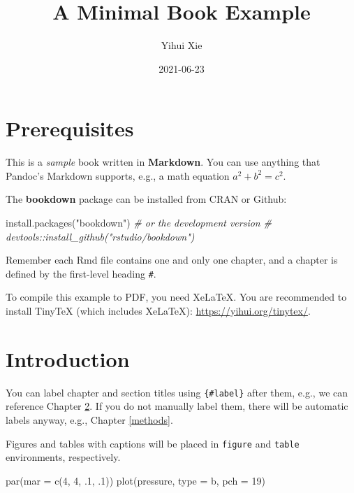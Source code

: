 \documentclass[
]{book}
\title{A Minimal Book Example}
\author{Yihui Xie}
\date{2021-06-23}
\newenvironment{Shaded}{\begin{snugshade}}{\end{snugshade}}
\newcommand{\AttributeTok}[1]{\textcolor[rgb]{0.77,0.63,0.00}{#1}}
\newcommand{\CommentTok}[1]{\textcolor[rgb]{0.56,0.35,0.01}{\textit{#1}}}
\newcommand{\DecValTok}[1]{\textcolor[rgb]{0.00,0.00,0.81}{#1}}
\newcommand{\FunctionTok}[1]{\textcolor[rgb]{0.00,0.00,0.00}{#1}}
\newcommand{\NormalTok}[1]{#1}
\newcommand{\StringTok}[1]{\textcolor[rgb]{0.31,0.60,0.02}{#1}}
\begin{document}
\maketitle

{
\setcounter{tocdepth}{1}
\tableofcontents
}
\hypertarget{prerequisites}{%
\chapter{Prerequisites}\label{prerequisites}}

This is a \emph{sample} book written in \textbf{Markdown}. You can use anything that Pandoc's Markdown supports, e.g., a math equation \(a^2 + b^2 = c^2\).

The \textbf{bookdown} package can be installed from CRAN or Github:

\begin{Shaded}
\begin{Highlighting}[]
\FunctionTok{install.packages}\NormalTok{(}\StringTok{"bookdown"}\NormalTok{)}
\CommentTok{\# or the development version}
\CommentTok{\# devtools::install\_github("rstudio/bookdown")}
\end{Highlighting}
\end{Shaded}

Remember each Rmd file contains one and only one chapter, and a chapter is defined by the first-level heading \texttt{\#}.

To compile this example to PDF, you need XeLaTeX. You are recommended to install TinyTeX (which includes XeLaTeX): \url{https://yihui.org/tinytex/}.

\hypertarget{intro}{%
\chapter{Introduction}\label{intro}}

You can label chapter and section titles using \texttt{\{\#label\}} after them, e.g., we can reference Chapter \ref{intro}. If you do not manually label them, there will be automatic labels anyway, e.g., Chapter \ref{methods}.

Figures and tables with captions will be placed in \texttt{figure} and \texttt{table} environments, respectively.

\begin{Shaded}
\begin{Highlighting}[]
\FunctionTok{par}\NormalTok{(}\AttributeTok{mar =} \FunctionTok{c}\NormalTok{(}\DecValTok{4}\NormalTok{, }\DecValTok{4}\NormalTok{, .}\DecValTok{1}\NormalTok{, .}\DecValTok{1}\NormalTok{))}
\FunctionTok{plot}\NormalTok{(pressure, }\AttributeTok{type =} \StringTok{\textquotesingle{}b\textquotesingle{}}\NormalTok{, }\AttributeTok{pch =} \DecValTok{19}\NormalTok{)}
\end{Highlighting}
\end{Shaded}
\end{document}
